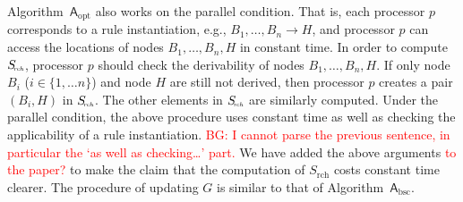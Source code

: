 \documentclass{article}
\begin{document}
Algorithm~$\mathsf{A}_{\text{opt}}$ also works on the parallel condition.
That is, each processor $p$ corresponds to a rule instantiation, e.g., $B_1,\ldots,B_n\rightarrow H$,
and processor $p$ can access the locations of nodes $B_1,\ldots,B_n, H$ in constant time.
In order to compute $S_{\!\textit{\tiny rch}}$, processor $p$ should check the derivability
of nodes $B_1,\ldots,B_n, H$. If only node $B_i$ ($i\in\{1,\ldots n\}$) and node $H$
are still not derived, then processor $p$ creates a pair $(B_i, H)$ in $S_{\!\textit{\tiny rch}}$.
The other elements in $S_{\!\textit{\tiny rch}}$ are similarly computed.
Under the parallel condition, the above procedure uses constant time as well as checking
the applicability of a rule instantiation. \textcolor{red}{BG: I
  cannot parse the previous sentence, in particular the `as well as
  checking\ldots' part.}
We have added the above arguments \textcolor{red}{to the paper?} to
make the claim that the computation of $S_\text{rch}$ costs
constant time clearer.
The procedure of updating $G$ is similar to that of Algorithm~$\mathsf{A}_{\text{bsc}}$.



\end{document}

